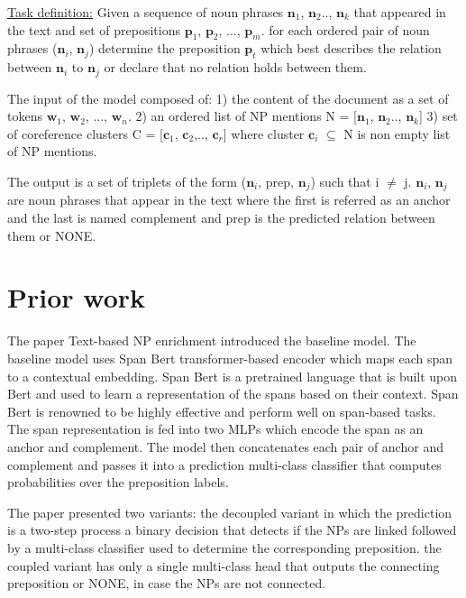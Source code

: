 \documentclass[11pt, a4paper, twocolumn]{article}
\begin{document}
\underline{Task definition:} Given a sequence of noun phrases $\mathbf{n}_1$, $\mathbf{n}_2$.., $\mathbf{n}_k$ that appeared in the text and set of prepositions $\mathbf{p}_1$, $\mathbf{p}_2$, ..., $\mathbf{p}_m$.
for each ordered pair of noun phrases ($\mathbf{n}_i$, $\mathbf{n}_j$) determine the preposition $\mathbf{p}_t$ which best describes the relation between $\mathbf{n}_i$ to $\mathbf{n}_j$ or declare that no relation holds between them.

The input of the model composed of:
1) the content of the document as a set of tokens $\mathbf{w}_1$, $\mathbf{w}_2$, ..., $\mathbf{w}_n$.
2) an ordered list of NP mentions N = [$\mathbf{n}_1$, $\mathbf{n}_2$.., $\mathbf{n}_k$]
3) set of coreference clusters C = [$\mathbf{c}_1$, $\mathbf{c}_2$,.., $\mathbf{c}_r$] where cluster $\mathbf{c}_i$  $\mathbf{\subseteq}$ N is non empty list of NP mentions. 


The output is a set of triplets of the form ($\mathbf{n}_i$, prep, $\mathbf{n}_j$) such that i $\mathbf{\neq}$ j.
$\mathbf{n}_i$, $\mathbf{n}_j$ are noun phrases that appear in the text where the first is referred as an anchor and the last is named complement and prep is the predicted relation between them or NONE.


\section{Prior work}
\label{priorwork}

The paper Text-based NP enrichment \cite{tne} introduced the baseline model. 
The baseline model uses Span Bert transformer-based encoder which maps each span to a contextual embedding.
Span Bert \cite{joshi2019spanbert} is a pretrained language that is built upon Bert \cite{devlin2018bert} and used to learn a representation of the spans based on their context. Span Bert is renowned to be highly effective and perform well on span-based tasks.
The span representation is fed into two MLPs which encode the span as an anchor and complement.
The model then concatenates each pair of anchor and complement and passes it into a prediction multi-class classifier that computes probabilities over the preposition labels.

The paper presented two variants: the decoupled variant in which the prediction is a two-step process a binary decision that detects if the NPs are linked followed by a multi-class classifier used to determine the corresponding preposition.
the coupled variant has only a single multi-class head that outputs the connecting preposition or NONE, in case the NPs are not connected.
\end{document}
